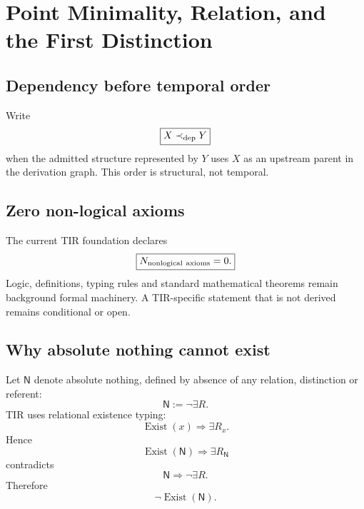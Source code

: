 \chapter{Point Minimality, Relation, and the First Distinction}
\label{ch:v12_first_distinction}

\section{Dependency before temporal order}

Write
\begin{equation}
\boxed{X\prec_{\rm dep}Y}
\end{equation}
when the admitted structure represented by $Y$ uses $X$ as an upstream parent in the derivation graph. This order is structural, not temporal.

\section{Zero non-logical axioms}

The current TIR foundation declares
\begin{equation}
\boxed{N_{\rm nonlogical\ axioms}=0.}
\label{eq:v12_zero_axiom_count}
\end{equation}
Logic, definitions, typing rules and standard mathematical theorems remain background formal machinery. A TIR-specific statement that is not derived remains conditional or open.

\section{Why absolute nothing cannot exist}

Let $\mathsf N$ denote absolute nothing, defined by absence of any relation, distinction or referent:
\begin{equation}
\mathsf N:=\neg\exists R.
\end{equation}
TIR uses relational existence typing:
\begin{equation}
\operatorname{Exist}(x)\Longrightarrow\exists R_x.
\end{equation}
Hence
\begin{equation}
\operatorname{Exist}(\mathsf N)
\Longrightarrow
\exists R_{\mathsf N}
\end{equation}
contradicts
\begin{equation}
\mathsf N\Longrightarrow\neg\exists R.
\end{equation}
Therefore
\begin{equation}
\boxed{\neg\operatorname{Exist}(\mathsf N).}
\label{eq:v12_nothing_nonrealizable}
\end{equation}

